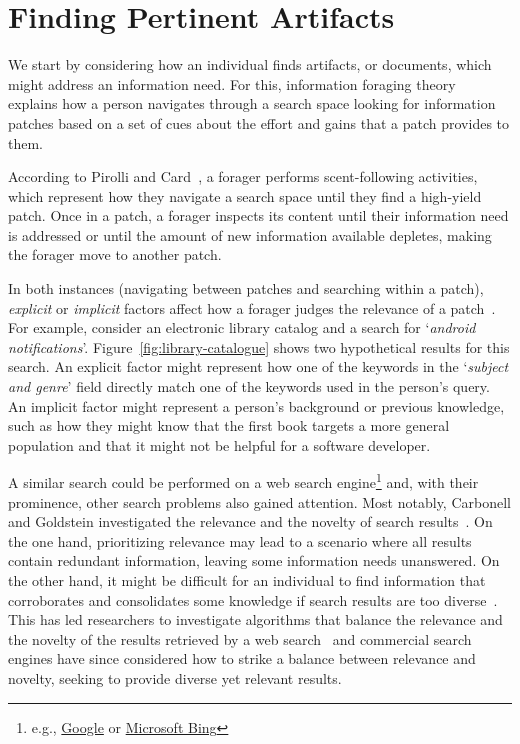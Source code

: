 


\section{Finding Pertinent Artifacts}
\label{cp2:searching}


We start by considering how an individual finds 
artifacts, or documents, which might 
address an information need. 
For this, information foraging theory~\cite{Pirolli1999} explains how a person navigates through  
a search space looking for information patches  based on 
a set of cues about the effort and gains that a patch provides to them.


According to Pirolli and Card~\cite{Pirolli1999}, a forager performs scent-following activities, which represent 
how they navigate a search space until they find a high-yield patch. 
Once in a patch, a forager inspects its content until their information need is addressed or until the amount of new information available depletes, making the forager move to another patch. 


In both instances (navigating between patches and searching within a patch), \textit{explicit} or \textit{implicit} factors affect how a forager judges the relevance of a patch~\cite{saracevic1975}.
For example,
consider an electronic library catalog and a search for `\textit{android notifications}'.
Figure~\ref{fig:library-catalogue} shows two hypothetical results for this search. %
An explicit factor might represent how one of the keywords in the `\textit{subject and genre}' field
directly match one of the keywords used in the person's query. An implicit factor might represent 
a person's background or previous knowledge, such as how 
they might know that the first book targets a more general population and 
that it might not be helpful for a software developer.







A similar search could be performed on a web search engine\footnote{e.g., \href{https://www.google.com/}{Google} or \href{https://www.bing.com/}{Microsoft Bing}}
and, with their prominence, other search problems also gained attention.
Most notably,  Carbonell and Goldstein investigated the relevance and the novelty of search results~\cite{Carbonell1998}.
On the one hand, prioritizing relevance may lead to a scenario where all results contain redundant information, leaving some information needs unanswered. 
On the other hand, it might be difficult for an individual 
to find information that corroborates and consolidates some knowledge if search results are too diverse~\cite{clark2013relevance}.  
This has led researchers to investigate 
algorithms that balance the relevance and the novelty of the results retrieved
by a web search~\cite{najork2001, rafiei2010, vieira2011}
and commercial search engines have since considered how to strike a balance
between relevance and novelty, seeking to provide diverse  
yet relevant results.



